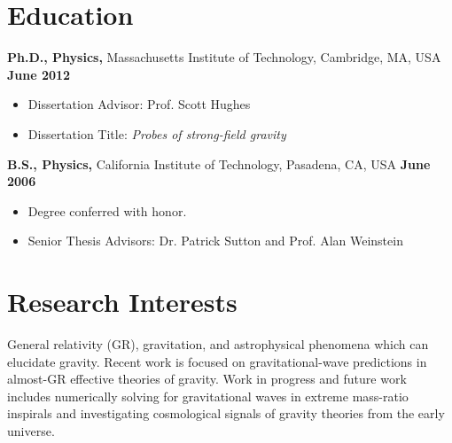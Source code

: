 \documentclass[margin,line]{res}
\begin{document}
\newcommand{\myname}{Leo C. Stein}
\newlength{\mynamewidth}
\settowidth{\mynamewidth}{\namefont\myname}

\name{\hspace*{0.5\textwidth}\hspace{-0.5\mynamewidth} \myname \vspace*{.1in}}
\thispagestyle{empty}

\begin{resume}



\section{\sc Education}
{\bf Ph.D., Physics,} Massachusetts Institute of Technology, Cambridge, MA, USA \hfill {\bf June 2012}\\
\vspace*{-.1in}
\begin{itemize}
\item[ ] Dissertation Advisor: Prof. Scott Hughes
\item[ ] Dissertation Title: {\it Probes of strong-field gravity}
\end{itemize}

{\bf B.S., Physics,} California Institute of
Technology, Pasadena, CA, USA \hfill {\bf June 2006}\\
\vspace*{-.1in}
\begin{itemize}
\item[ ] Degree conferred with honor.
\item[ ] Senior Thesis Advisors: Dr. Patrick Sutton and Prof. Alan Weinstein
\end{itemize}

\section{\sc Research Interests}
General relativity (GR), gravitation, and astrophysical phenomena which can
elucidate gravity. Recent work is focused on gravitational-wave predictions
in almost-GR effective theories of gravity. Work in progress and
future work includes numerically solving for gravitational waves in
extreme mass-ratio inspirals and investigating cosmological
signals of gravity theories from the early universe.


\end{resume}
\end{document}
